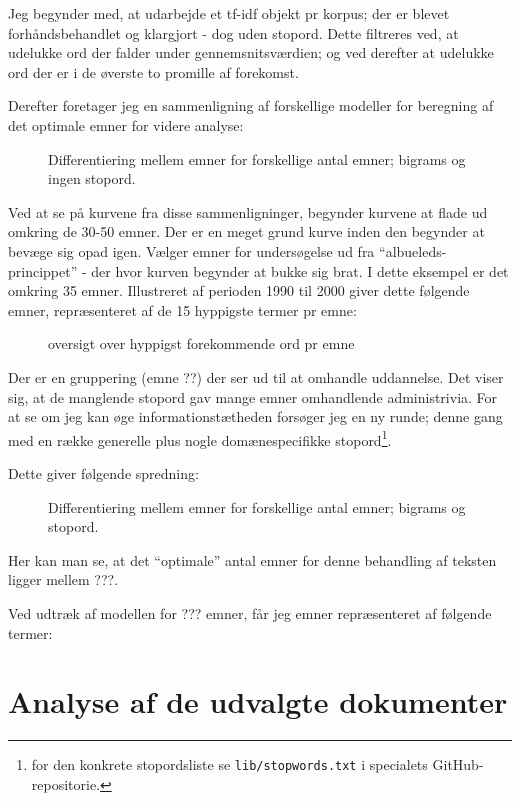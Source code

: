 Jeg begynder med, at udarbejde et tf-idf objekt pr korpus; der er blevet forhåndsbehandlet og klargjort - dog uden stopord.
Dette filtreres ved, at udelukke ord der falder under gennemsnitsværdien; og ved derefter at udelukke ord der er i de øverste to promille af forekomst.

Derefter foretager jeg en sammenligning af forskellige modeller for beregning af det optimale emner for videre analyse:

\begin{figure}[H]
\centering

\caption{Differentiering mellem emner for forskellige antal emner; bigrams og ingen stopord. }
\end{figure}

Ved at se på kurvene fra disse sammenligninger, begynder kurvene at flade ud omkring de 30-50 emner.
Der er en meget grund kurve inden den begynder at bevæge sig opad igen.
Vælger emner for undersøgelse ud fra “albueleds-princippet” - der hvor kurven begynder at bukke sig brat.
I dette eksempel er det omkring 35 emner.
Illustreret af perioden 1990 til 2000 giver dette følgende emner, repræsenteret af de 15 hyppigste termer pr emne:

\begin{figure}[H]
  \small
\centering

\caption{oversigt over hyppigst forekommende ord pr emne}
\end{figure}


Der er en gruppering (emne ??) der ser ud til at omhandle uddannelse.
Det viser sig, at de manglende stopord gav mange emner omhandlende administrivia. For at se om jeg kan øge informationstætheden forsøger jeg en ny runde; denne gang med en række generelle plus nogle domænespecifikke stopord\footnote{for den konkrete stopordsliste se \texttt{lib/stopwords.txt} i specialets GitHub-repositorie.}.

Dette giver følgende spredning:

\begin{figure}[H]
\centering

\caption{Differentiering mellem emner for forskellige antal emner; bigrams og stopord. }
\end{figure}

Her kan man se, at det “optimale” antal emner for denne behandling af teksten ligger mellem ???.

Ved udtræk af modellen for ??? emner, får jeg emner repræsenteret af følgende termer:

\chapter{Analyse af de udvalgte dokumenter}


